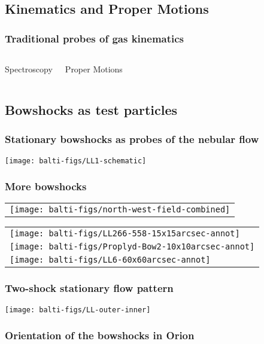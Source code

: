 \documentclass[presentation]{beamer}
\begin{document}
\subsection{Kinematics and Proper Motions}
\begin{frame}
  \frametitle{Traditional probes of gas kinematics}
  \begin{columns}
    \begin{block}{Spectroscopy}
      
    \end{block}
    \begin{block}{Proper Motions}
      
    \end{block}
  \end{columns}
\end{frame}

\subsection{Bowshocks as test particles}

\begin{frame}
  \frametitle{Stationary bowshocks as probes of the nebular flow}
  \texttt{[image: balti-figs/LL1-schematic]}
\end{frame}

\begin{frame}
  \frametitle{More bowshocks}
  \renewcommand\arraystretch{0}
  \setlength\tabcolsep{0pt}
  \begin{tabular}{l}
    \texttt{[image: balti-figs/north-west-field-combined]}\\
  \end{tabular}%
  \begin{tabular}{l}
    \texttt{[image: balti-figs/LL266-558-15x15arcsec-annot]}\\
    \texttt{[image: balti-figs/Proplyd-Bow2-10x10arcsec-annot]}\\
    \texttt{[image: balti-figs/LL6-60x60arcsec-annot]}\\
  \end{tabular}
\end{frame}

\begin{frame}
  \frametitle{Two-shock stationary flow pattern}
  \centering\texttt{[image: balti-figs/LL-outer-inner]}
\end{frame}

\begin{frame}
  \frametitle{Orientation of the bowshocks in Orion}
  \centering
\end{frame}
\end{document}

